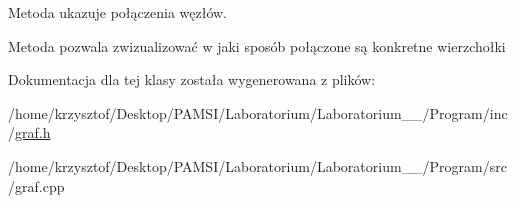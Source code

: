 \-Metoda ukazuje połączenia węzłów. 

\-Metoda pozwala zwizualizować w jaki sposób połączone są konkretne wierzchołki 

\-Dokumentacja dla tej klasy została wygenerowana z plików\-:\begin{DoxyCompactItemize}
\item 
/home/krzysztof/\-Desktop/\-P\-A\-M\-S\-I/\-Laboratorium/\-Laboratorium\-\_\-\_/\-Program/inc/\hyperlink{graf_8h}{graf.\-h}\item 
/home/krzysztof/\-Desktop/\-P\-A\-M\-S\-I/\-Laboratorium/\-Laboratorium\-\_\-\_/\-Program/src/graf.\-cpp\end{DoxyCompactItemize}
